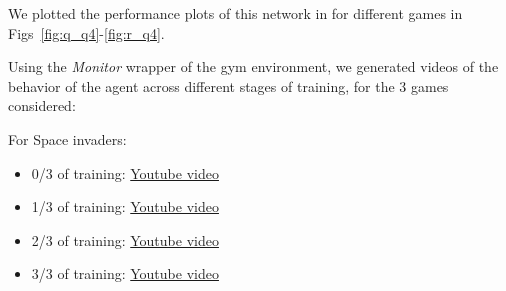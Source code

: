 \documentclass{article}
\begin{document}
We plotted the performance plots of this network in for different games in Figs~\ref{fig:q_q4}-\ref{fig:r_q4}.







Using the \textit{Monitor} wrapper of the gym environment, we generated videos of the behavior of the agent across different stages of training, for the 3 games considered:

For Space invaders:
\begin{itemize}
  \item 0/3 of training: \href{http://www.sharelatex.com}{Youtube video}
  \item 1/3 of training: \href{http://www.sharelatex.com}{Youtube video}
  \item 2/3 of training: \href{http://www.sharelatex.com}{Youtube video}
  \item 3/3 of training: \href{http://www.sharelatex.com}{Youtube video}
\end{itemize}
\end{document}
